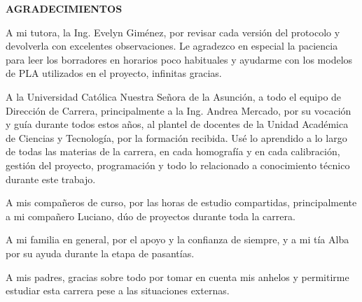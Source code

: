\thispagestyle{plain}
\begin{center}
  {\Large\bfseries AGRADECIMIENTOS}
\end{center}

\vspace{0.8\baselineskip}

\begin{center}
  \begin{minipage}{0.90\textwidth}
    \justifying
    \setlength{\parskip}{6pt plus 1pt minus 1pt}
    \setlength{\parindent}{25pt}
 A mi tutora, la Ing. Evelyn Giménez, por revisar cada versión del protocolo y devolverla con excelentes observaciones. Le agradezco en especial la paciencia para leer los borradores en horarios poco habituales y ayudarme con los modelos de PLA utilizados en el proyecto, infinitas gracias.

 A la Universidad Católica Nuestra Señora de la Asunción, a todo el equipo de Dirección de Carrera, principalmente a la Ing. Andrea Mercado, por su vocación y guía durante todos estos años, al plantel de docentes de la Unidad Académica de Ciencias y Tecnología, por la formación recibida. Usé lo aprendido a lo largo de todas las materias de la carrera, en cada homografía y en cada calibración, gestión del proyecto, programación y todo lo relacionado a conocimiento técnico durante este trabajo.

  A mis compañeros de curso, por las horas de estudio compartidas, principalmente a mi compañero Luciano, dúo de proyectos durante toda la carrera.

  A mi familia en general, por el apoyo y la confianza de siempre, y a mi tía Alba por su ayuda durante la etapa de pasantías.
  
  A mis padres, gracias sobre todo por tomar en cuenta mis anhelos y permitirme estudiar esta carrera pese a las situaciones externas.


  \end{minipage}
\end{center}
\clearpage
